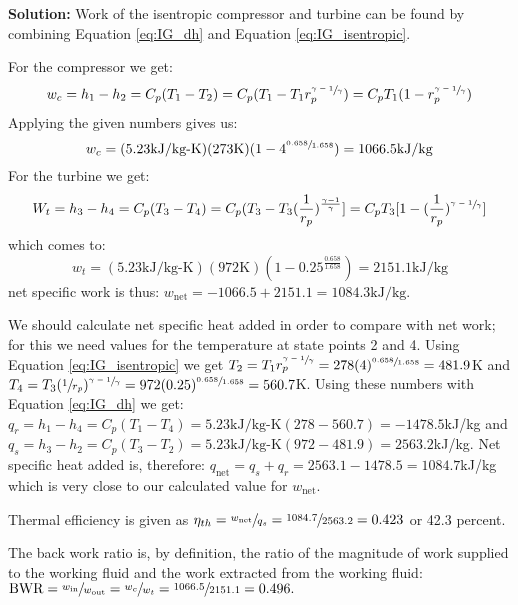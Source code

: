 \begin{fullwidth}
\textbf{Solution:} 
Work of the isentropic compressor and turbine can be found by combining Equation \ref{eq:IG_dh} and Equation \ref{eq:IG_isentropic}.  

For the compressor we get:
$$w_c = h_1 - h_2 = C_p(T_1 - T_2) = C_p(T_1 - T_1 r_p^{\sfrac{\gamma - 1}{\gamma}}) = C_p T_1 (1 - r_p^{\sfrac{\gamma - 1}{\gamma}})$$
Applying the given numbers gives us:
$$w_c = (5.23 \text{kJ/kg-K})(273 \text{K})(1-4^{\sfrac{0.658}{1.658}}) = 1066.5 \text{kJ/kg}$$
For the turbine we get:
$$W_t = h_3 - h_4 = C_p(T_3 - T_4) = C_p(T_3 - T_3(\frac{1}{r_p})^{\frac{\gamma-1}{\gamma}}] = C_p T_3 [1 - (\frac{1}{r_p})^{\sfrac{\gamma-1}{\gamma}}]$$
which comes to:
$$w_t = (5.23 \text{kJ/kg-K})(972 \text{K})(1 - 0.25^{\frac{0.658}{1.658}}) = 2151.1 \text{kJ/kg}$$
net specific work is thus: $w_{\text{net}}=-1066.5 + 2151.1 = 1084.3 \text{kJ/kg}$.

\vspace{0.5cm}

We should calculate net specific heat added in order to compare with net work; for this we need values for the temperature at state points 2 and 4.  Using Equation \ref{eq:IG_isentropic} we get $T_2 = T_1 r_p^{\sfrac{\gamma-1}{\gamma}} = 278(4)^{\sfrac{0.658}{1.658}}=481.9$K and $T_4 = T_3 (\sfrac{1}{r_p})^{\sfrac{\gamma - 1}{\gamma}} = 972(0.25)^{\sfrac{0.658}{1.658}} = 560.7$K.  
Using these numbers with Equation \ref{eq:IG_dh} we get: $q_r = h_1 - h_4 = C_p(T_1 - T_4) = 5.23 \text{kJ/kg-K}(278 - 560.7) = -1478.5$kJ/kg and $q_s = h_3 - h_2 = C_p(T_3 - T_2) = 5.23 \text{kJ/kg-K}(972 - 481.9) = 2563.2$kJ/kg. 
Net specific heat added is, therefore: $q_{\text{net}} = q_s + q_r = 2563.1 - 1478.5 = 1084.7$kJ/kg which is very close to our calculated value for $w_{\text{net}}$.  

\vspace{0.5cm}
Thermal efficiency is given as $\eta_{th} = \sfrac{w_{\text{net}}}{q_s} = \sfrac{1084.7}{2563.2} = 0.423$ or 42.3 percent.

\vspace{0.5cm} 

The back work ratio is, by definition, the ratio of the magnitude of work supplied to the working fluid and the work extracted from the working fluid: $\text{BWR} = \sfrac{w_{\text{in}}}{w_{\text{out}}} = \sfrac{w_c}{w_t} = \sfrac{1066.5}{2151.1} = 0.496.$
\end{fullwidth}

